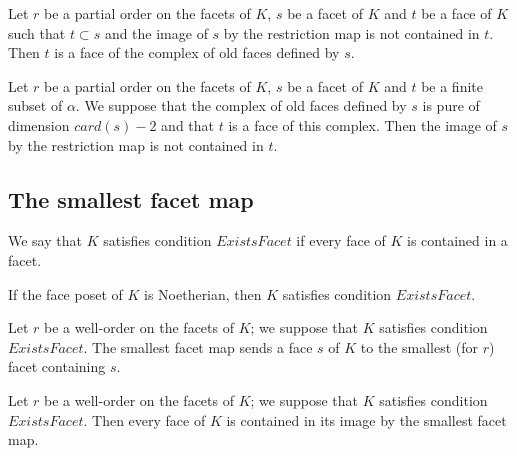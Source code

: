\begin{sublemma}
Let $r$ be a partial order on the facets of $K$, $s$ be a facet of $K$ and $t$ be a face of $K$ such that $t\subset s$ and
the image of $s$ by the restriction map is not contained in $t$. Then $t$ is a face of the complex of old faces defined by $s$.

\end{sublemma}

\begin{sublemma}
Let $r$ be a partial order on the facets of $K$, $s$ be a facet of $K$ and $t$ be a finite subset of $\alpha$. We suppose that
the complex of old faces defined by $s$ is pure of dimension $card(s)-2$ and that $t$ is a face of this complex. Then
the image of $s$ by the restriction map is not contained in $t$.

\end{sublemma}


\subsection{The smallest facet map}

\begin{subdefi}[ExistsFacet]
We say that $K$ satisfies condition $ExistsFacet$ if every face of $K$ is contained in a facet.

\end{subdefi}

\begin{sublemma}
If the face poset of $K$ is Noetherian, then $K$ satisfies condition $ExistsFacet$.

\end{sublemma}

\begin{subdefi}[ShellingOrderSmallestFacet]
Let $r$ be a well-order on the facets of $K$; we suppose that $K$ satisfies condition $ExistsFacet$.
The smallest facet map sends a face $s$ of $K$ to the smallest (for $r$) facet containing $s$.

\end{subdefi}

\begin{sublemma}
Let $r$ be a well-order on the facets of $K$; we suppose that $K$ satisfies condition $ExistsFacet$.
Then every face of $K$ is contained in its image by the smallest facet map.

\end{sublemma}

